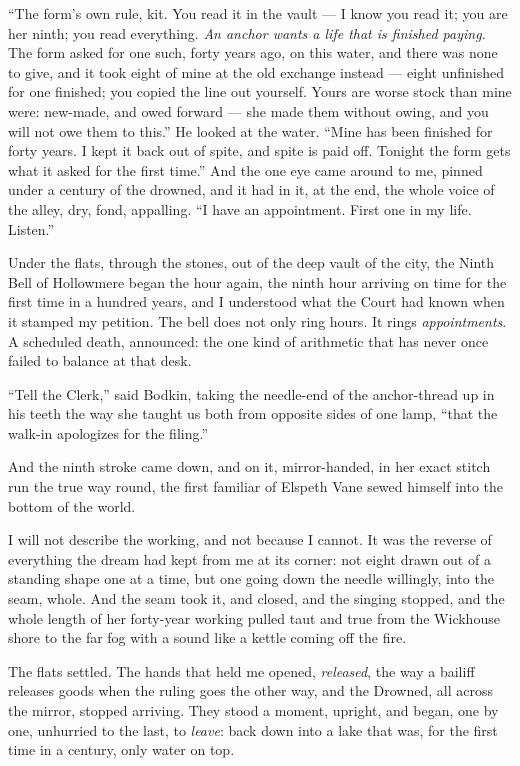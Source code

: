 ``The form's own rule, kit. You read it in the vault --- I know you read it; you are her ninth; you read everything. \emph{An anchor wants a life that is finished paying.} The form asked for one such, forty years ago, on this water, and there was none to give, and it took eight of mine at the old exchange instead --- eight unfinished for one finished; you copied the line out yourself. Yours are worse stock than mine were: new-made, and owed forward --- she made them without owing, and you will not owe them to this.'' He looked at the water. ``Mine has been finished for forty years. I kept it back out of spite, and spite is paid off. Tonight the form gets what it asked for the first time.'' And the one eye came around to me, pinned under a century of the drowned, and it had in it, at the end, the whole voice of the alley, dry, fond, appalling. ``I have an appointment. First one in my life. Listen.''

Under the flats, through the stones, out of the deep vault of the city, the Ninth Bell of Hollowmere began the hour again, the ninth hour arriving on time for the first time in a hundred years, and I understood what the Court had known when it stamped my petition. The bell does not only ring hours. It rings \emph{appointments}. A scheduled death, announced: the one kind of arithmetic that has never once failed to balance at that desk.

``Tell the Clerk,'' said Bodkin, taking the needle-end of the anchor-thread up in his teeth the way she taught us both from opposite sides of one lamp, ``that the walk-in apologizes for the filing.''

And the ninth stroke came down, and on it, mirror-handed, in her exact stitch run the true way round, the first familiar of Elspeth Vane sewed himself into the bottom of the world.

I will not describe the working, and not because I cannot. It was the reverse of everything the dream had kept from me at its corner: not eight drawn out of a standing shape one at a time, but one going down the needle willingly, into the seam, whole. And the seam took it, and closed, and the singing stopped, and the whole length of her forty-year working pulled taut and true from the Wickhouse shore to the far fog with a sound like a kettle coming off the fire.

The flats settled. The hands that held me opened, \emph{released}, the way a bailiff releases goods when the ruling goes the other way, and the Drowned, all across the mirror, stopped arriving. They stood a moment, upright, and began, one by one, unhurried to the last, to \emph{leave}: back down into a lake that was, for the first time in a century, only water on top.

